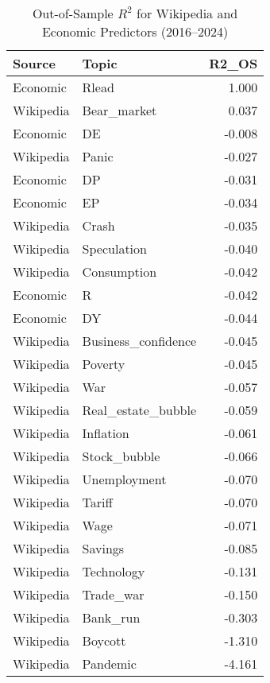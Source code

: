 \begin{table}[ht]
\centering
\begin{tabular}{llr}
  \hline
Source & Topic & R2\_OS \\ 
  \hline
Economic & Rlead & 1.000 \\ 
  Wikipedia & Bear\_market & 0.037 \\ 
  Economic & DE & -0.008 \\ 
  Wikipedia & Panic & -0.027 \\ 
  Economic & DP & -0.031 \\ 
  Economic & EP & -0.034 \\ 
  Wikipedia & Crash & -0.035 \\ 
  Wikipedia & Speculation & -0.040 \\ 
  Wikipedia & Consumption & -0.042 \\ 
  Economic & R & -0.042 \\ 
  Economic & DY & -0.044 \\ 
  Wikipedia & Business\_confidence & -0.045 \\ 
  Wikipedia & Poverty & -0.045 \\ 
  Wikipedia & War & -0.057 \\ 
  Wikipedia & Real\_estate\_bubble & -0.059 \\ 
  Wikipedia & Inflation & -0.061 \\ 
  Wikipedia & Stock\_bubble & -0.066 \\ 
  Wikipedia & Unemployment & -0.070 \\ 
  Wikipedia & Tariff & -0.070 \\ 
  Wikipedia & Wage & -0.071 \\ 
  Wikipedia & Savings & -0.085 \\ 
  Wikipedia & Technology & -0.131 \\ 
  Wikipedia & Trade\_war & -0.150 \\ 
  Wikipedia & Bank\_run & -0.303 \\ 
  Wikipedia & Boycott & -1.310 \\ 
  Wikipedia & Pandemic & -4.161 \\ 
   \hline
\end{tabular}
\caption{Out-of-Sample $R^2$ for Wikipedia and Economic Predictors (2016–2024)} 
\label{tab:table8_combined}
\end{table}
